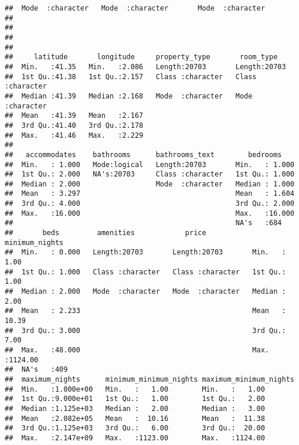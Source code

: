 \begin{verbatim}
##  Mode  :character   Mode  :character       Mode  :character            
##                                                                        
##                                                                        
##                                                                        
##                                                                        
##     latitude       longitude     property_type       room_type        
##  Min.   :41.35   Min.   :2.086   Length:20703       Length:20703      
##  1st Qu.:41.38   1st Qu.:2.157   Class :character   Class :character  
##  Median :41.39   Median :2.168   Mode  :character   Mode  :character  
##  Mean   :41.39   Mean   :2.167                                        
##  3rd Qu.:41.40   3rd Qu.:2.178                                        
##  Max.   :41.46   Max.   :2.229                                        
##                                                                       
##   accommodates    bathrooms      bathrooms_text        bedrooms     
##  Min.   : 1.000   Mode:logical   Length:20703       Min.   : 1.000  
##  1st Qu.: 2.000   NA's:20703     Class :character   1st Qu.: 1.000  
##  Median : 2.000                  Mode  :character   Median : 1.000  
##  Mean   : 3.297                                     Mean   : 1.604  
##  3rd Qu.: 4.000                                     3rd Qu.: 2.000  
##  Max.   :16.000                                     Max.   :16.000  
##                                                     NA's   :684     
##       beds         amenities            price           minimum_nights   
##  Min.   : 0.000   Length:20703       Length:20703       Min.   :   1.00  
##  1st Qu.: 1.000   Class :character   Class :character   1st Qu.:   1.00  
##  Median : 2.000   Mode  :character   Mode  :character   Median :   2.00  
##  Mean   : 2.233                                         Mean   :  10.39  
##  3rd Qu.: 3.000                                         3rd Qu.:   7.00  
##  Max.   :48.000                                         Max.   :1124.00  
##  NA's   :409                                                             
##  maximum_nights      minimum_minimum_nights maximum_minimum_nights
##  Min.   :1.000e+00   Min.   :   1.00        Min.   :   1.00       
##  1st Qu.:9.000e+01   1st Qu.:   1.00        1st Qu.:   2.00       
##  Median :1.125e+03   Median :   2.00        Median :   3.00       
##  Mean   :2.082e+05   Mean   :  10.16        Mean   :  11.38       
##  3rd Qu.:1.125e+03   3rd Qu.:   6.00        3rd Qu.:  20.00       
##  Max.   :2.147e+09   Max.   :1123.00        Max.   :1124.00       

\end{verbatim}
